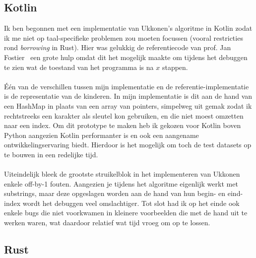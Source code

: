 \subsection{Kotlin}\label{subsec:kotlin}
Ik ben begonnen met een implementatie van Ukkonen's algoritme in Kotlin zodat ik me niet op taal-specifieke problemen zou moeten focussen (vooral restricties rond \textit{borrowing} in Rust).
Hier was gelukkig de referentiecode van prof. Jan Fostier~\cite{Ukkonen_CCB} een grote hulp omdat dit het mogelijk maakte om tijdens het debuggen te zien wat de toestand van het programma is na $x$ stappen.
\\ \\
Één van de verschillen tussen mijn implementatie en de referentie-implementatie is de representatie van de kinderen.
In mijn implementatie is dit aan de hand van een HashMap in plaats van een array van pointers, simpelweg uit gemak zodat ik rechtstreeks een karakter als sleutel kon gebruiken, en die niet moest omzetten naar een index.
Om dit prototype te maken heb ik gekozen voor Kotlin boven Python aangezien Kotlin performanter is en ook een aangename ontwikkelingservaring biedt.
Hierdoor is het mogelijk om toch de test datasets op te bouwen in een redelijke tijd.
\\ \\
Uiteindelijk bleek de grootste struikelblok in het implementeren van Ukkonen enkele off-by-1 fouten.
Aangezien je tijdens het algoritme eigenlijk werkt met substrings, maar deze opgeslagen worden aan de hand van hun begin- en eind-index wordt het debuggen veel omslachtiger.
Tot slot had ik op het einde ook enkele bugs die niet voorkwamen in kleinere voorbeelden die met de hand uit te werken waren, wat daardoor relatief wat tijd vroeg om op te lossen.

\subsection{Rust}\label{subsec:rust}

